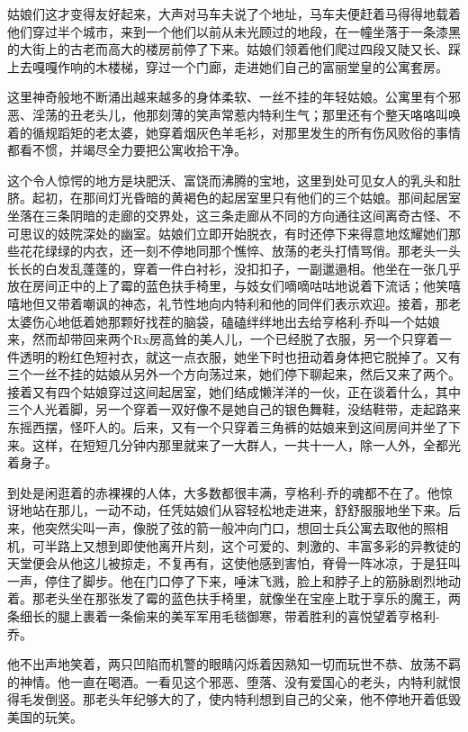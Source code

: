  


    姑娘们这才变得友好起来，大声对马车夫说了个地址，马车夫便赶着马得得地载着他们穿过半个城市，来到一个他们以前从未光顾过的地段，在一幢坐落于一条漆黑的大街上的古老而高大的楼房前停了下来。姑娘们领着他们爬过四段又陡又长、踩上去嘎嘎作响的木楼梯，穿过一个门廊，走进她们自己的富丽堂皇的公寓套房。

    这里神奇般地不断涌出越来越多的身体柔软、一丝不挂的年轻姑娘。公寓里有个邪恶、淫荡的丑老头儿，他那刻薄的笑声常惹内特利生气；那里还有个整天咯咯叫唤着的循规蹈矩的老太婆，她穿着烟灰色羊毛衫，对那里发生的所有伤风败俗的事情都看不惯，并竭尽全力要把公寓收拾干净。

    这个令人惊愕的地方是块肥沃、富饶而沸腾的宝地，这里到处可见女人的乳头和肚脐。起初，在那间灯光昏暗的黄褐色的起居室里只有他们的三个姑娘。那间起居室坐落在三条阴暗的走廊的交界处，这三条走廊从不同的方向通往这间离奇古怪、不可思议的妓院深处的幽室。姑娘们立即开始脱衣，有时还停下来得意地炫耀她们那些花花绿绿的内衣，还一刻不停地同那个憔悴、放荡的老头打情骂俏。那老头一头长长的白发乱蓬蓬的，穿着一件白衬衫，没扣扣子，一副邋遢相。他坐在一张几乎放在房间正中的上了霉的蓝色扶手椅里，与妓女们嘀嘀咕咕地说着下流话；他笑嘻嘻地但又带着嘲讽的神态，礼节性地向内特利和他的同伴们表示欢迎。接着，那老太婆伤心地低着她那颗好找茬的脑袋，磕磕绊绊地出去给亨格利-乔叫一个姑娘来，然而却带回来两个Rx房高耸的美人儿，一个已经脱了衣服，另一个只穿着一件透明的粉红色短衬衣，就这一点衣服，她坐下时也扭动着身体把它脱掉了。又有三个一丝不挂的姑娘从另外一个方向荡过来，她们停下聊起来，然后又来了两个。接着又有四个姑娘穿过这间起居室，她们结成懒洋洋的一伙，正在谈着什么，其中三个人光着脚，另一个穿着一双好像不是她自己的银色舞鞋，没结鞋带，走起路来东摇西摆，怪吓人的。后来，又有一个只穿着三角裤的姑娘来到这间房间并坐了下来。这样，在短短几分钟内那里就来了一大群人，一共十一人，除一人外，全都光着身子。

 


    到处是闲逛着的赤裸裸的人体，大多数都很丰满，亨格利-乔的魂都不在了。他惊讶地站在那儿，一动不动，任凭姑娘们从容轻松地走进来，舒舒服服地坐下来。后来，他突然尖叫一声，像脱了弦的箭一般冲向门口，想回士兵公寓去取他的照相机，可半路上又想到即使他离开片刻，这个可爱的、刺激的、丰富多彩的异教徒的天堂便会从他这儿被掠走，不复再有，这使他感到害怕，脊骨一阵冰凉，于是狂叫一声，停住了脚步。他在门口停了下来，唾沫飞溅，脸上和脖子上的筋脉剧烈地动着。那老头坐在那张发了霉的蓝色扶手椅里，就像坐在宝座上耽于享乐的魔王，两条细长的腿上裹着一条偷来的美军军用毛毯御寒，带着胜利的喜悦望着亨格利-乔。

    他不出声地笑着，两只凹陷而机警的眼睛闪烁着因熟知一切而玩世不恭、放荡不羁的神情。他一直在喝酒。一看见这个邪恶、堕落、没有爱国心的老头，内特利就恨得毛发倒竖。那老头年纪够大的了，使内特利想到自己的父亲，他不停地开着低毁美国的玩笑。


